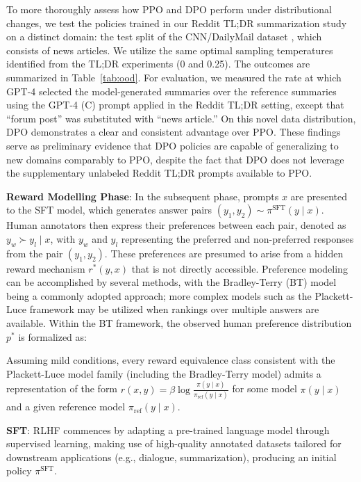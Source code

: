 To more thoroughly assess how PPO and DPO perform under distributional changes, we test the policies trained in our Reddit TL;DR summarization study on a distinct domain: the test split of the CNN/DailyMail dataset \citep{nallapati-etal-2016-abstractive}, which consists of news articles. We utilize the same optimal sampling temperatures identified from the TL;DR experiments (0 and 0.25). The outcomes are summarized in Table~\ref{tab:ood}. For evaluation, we measured the rate at which GPT-4 selected the model-generated summaries over the reference summaries using the GPT-4 (C) prompt applied in the Reddit TL;DR setting, except that ``forum post'' was substituted with ``news article.'' On this novel data distribution, DPO demonstrates a clear and consistent advantage over PPO. These findings serve as preliminary evidence that DPO policies are capable of generalizing to new domains comparably to PPO, despite the fact that DPO does not leverage the supplementary unlabeled Reddit TL;DR prompts available to PPO.

\textbf{Reward Modelling Phase}: In the subsequent phase, prompts $x$ are presented to the SFT model, which generates answer pairs $(y_1, y_2)\sim \pi^\text{SFT}(y \mid x)$. Human annotators then express their preferences between each pair, denoted as $y_w\succ y_l \mid x$, with $y_w$ and $y_l$ representing the preferred and non-preferred responses from the pair $(y_1, y_2)$. These preferences are presumed to arise from a hidden reward mechanism $r^*(y, x)$ that is not directly accessible. Preference modeling can be accomplished by several methods, with the Bradley-Terry (BT) model \cite{bradley1952rankanalysis} being a commonly adopted approach; more complex models such as the Plackett-Luce framework \citep{plackett1975analysis, luce2012individual} may be utilized when rankings over multiple answers are available. Within the BT framework, the observed human preference distribution $p^*$ is formalized as:

\begin{theorem}\label{thm:main}
    Assuming mild conditions, every reward equivalence class consistent with the Plackett-Luce model family (including the Bradley-Terry model) admits a representation of the form ${r(x, y) = \beta \log \frac{\pi(y\mid x)}{\pi_\text{ref}(y\mid x)}}$ for some model $\pi(y\mid x)$ and a given reference model $\pi_\text{ref}(y \mid x)$.
\end{theorem}

\textbf{SFT}: RLHF commences by adapting a pre-trained language model through supervised learning, making use of high-quality annotated datasets tailored for downstream applications (e.g., dialogue, summarization), producing an initial policy $\pi^\text{SFT}$.

